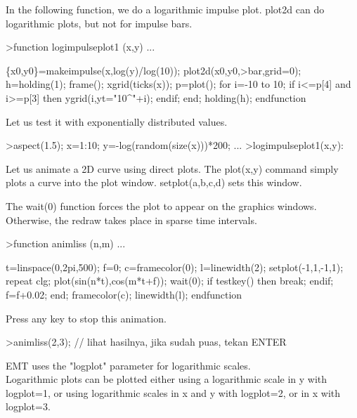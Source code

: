 \documentclass{article}
\begin{document}
\begin{eulernotebook}
\begin{eulercomment}
\begin{eulercomment}
\begin{eulercomment}
\begin{eulercomment}
\begin{eulercomment}
\begin{eulercomment}
\begin{eulercomment}
In the following function, we do a logarithmic impulse plot. plot2d can do logarithmic
plots, but not for impulse bars.
\end{eulercomment}
\begin{eulerprompt}
>function logimpulseplot1 (x,y) ...
\end{eulerprompt}
\begin{eulerudf}
    \{x0,y0\}=makeimpulse(x,log(y)/log(10));
    plot2d(x0,y0,>bar,grid=0);
    h=holding(1);
    frame();
    xgrid(ticks(x));
    p=plot();
    for i=-10 to 10;
      if i<=p[4] and i>=p[3] then
         ygrid(i,yt="10^"+i);
      endif;
    end;
    holding(h);
  endfunction
\end{eulerudf}
\begin{eulercomment}
Let us test it with exponentially distributed values.
\end{eulercomment}
\begin{eulerprompt}
>aspect(1.5); x=1:10; y=-log(random(size(x)))*200; ...
>logimpulseplot1(x,y):
\end{eulerprompt}
\begin{eulercomment}
Let us animate a 2D curve using direct plots. The plot(x,y) command
simply plots a curve into the plot window. setplot(a,b,c,d) sets this
window.

The wait(0) function forces the plot to appear on the graphics
windows. Otherwise, the redraw takes place in sparse time intervals.
\end{eulercomment}
\begin{eulerprompt}
>function animliss (n,m) ...
\end{eulerprompt}
\begin{eulerudf}
  t=linspace(0,2pi,500);
  f=0;
  c=framecolor(0);
  l=linewidth(2);
  setplot(-1,1,-1,1);
  repeat
    clg;
    plot(sin(n*t),cos(m*t+f));
    wait(0);
    if testkey() then break; endif;
    f=f+0.02;
  end;
  framecolor(c);
  linewidth(l);
  endfunction
\end{eulerudf}
\begin{eulercomment}
Press any key to stop this animation.
\end{eulercomment}
\begin{eulerprompt}
>animliss(2,3); // lihat hasilnya, jika sudah puas, tekan ENTER
\end{eulerprompt}
\begin{eulercomment}
EMT uses the "logplot" parameter for logarithmic scales.\\
Logarithmic plots can be plotted either using a logarithmic scale in y with logplot=1,
or using logarithmic scales in x and y with logplot=2, or in x with logplot=3.


\end{eulercomment}
\end{eulercomment}
\end{eulercomment}
\end{eulercomment}
\end{eulercomment}
\end{eulercomment}
\end{eulercomment}
\end{eulernotebook}
\end{document}
